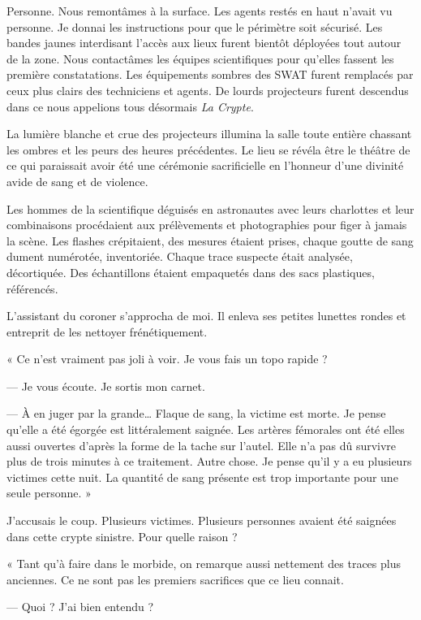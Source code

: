Personne. Nous remontâmes à la surface. Les agents restés en haut n'avait vu personne. Je donnai les instructions pour 
que le périmètre soit sécurisé. Les bandes jaunes interdisant l'accès aux lieux furent bientôt déployées tout autour 
de la zone. Nous contactâmes les équipes scientifiques pour qu'elles fassent les première constatations. Les 
équipements sombres des SWAT furent remplacés par ceux plus clairs des techniciens et agents. De lourds projecteurs 
furent descendus dans ce nous appelions tous désormais \emph{La Crypte}.

La lumière blanche et crue des projecteurs illumina la salle toute entière chassant les ombres et les peurs des heures 
précédentes. Le lieu se révéla être le théâtre de ce qui paraissait avoir été une cérémonie sacrificielle en l'honneur 
d'une divinité avide de sang et de violence.

Les hommes de la scientifique déguisés en astronautes avec leurs charlottes et leur combinaisons procédaient aux 
prélèvements et photographies pour figer à jamais la scène. Les flashes crépitaient, des mesures étaient prises, chaque 
goutte de sang dument numérotée, inventoriée. Chaque trace suspecte était analysée, décortiquée. Des échantillons 
étaient empaquetés dans des sacs plastiques, référencés.

L'assistant du coroner s'approcha de moi. Il enleva ses petites lunettes rondes et entreprit de les nettoyer 
frénétiquement.

« Ce n'est vraiment pas joli à voir. Je vous fais un topo rapide ?

— Je vous écoute. Je sortis mon carnet.

— À en juger par la grande… Flaque de sang, la victime est morte. Je pense qu'elle a été égorgée est littéralement 
saignée. Les artères fémorales ont été elles aussi ouvertes d'après la forme de la tache sur l'autel. Elle n'a pas dû 
survivre plus de trois minutes à ce traitement. Autre chose. Je pense qu'il y a eu plusieurs victimes cette nuit. La 
quantité de sang présente est trop importante pour une seule personne. »

J'accusais le coup. Plusieurs victimes. Plusieurs personnes avaient été saignées dans cette crypte sinistre. Pour 
quelle raison ?

« Tant qu'à faire dans le morbide, on remarque aussi nettement des traces plus anciennes. Ce ne sont pas les premiers 
sacrifices que ce lieu connait.

— Quoi ? J'ai bien entendu ?

